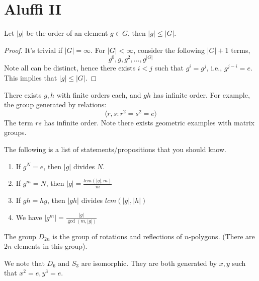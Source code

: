 \chapter{Aluffi II}

\begin{prop}
    Let $|g|$ be the order of an element $g\in G$, then $|g|\leq |G|$.
\end{prop}
\begin{proof}
    It's trivial if $|G|=\infty$. For $|G|<\infty$, consider the following $|G|+1$ terms,
    \begin{equation*}
        g^0, g, g^2, \ldots, g^{|G|}
    \end{equation*}
    Note all can be distinct, hence there exists $i<j$ such that $g^{i}=g^j$, i.e., $g^{j-i}=e$. This implies that $|g|\leq |G|$.
\end{proof}
\begin{example}
    There exists $g, h$ with finite orders each, and $gh$ has infinite order. For example, the group generated by relations:
    \begin{equation*}
        \langle r,s: r^2=s^2=e\rangle
    \end{equation*}
    The term $rs$ has infinite order. Note there exists geometric examples with matrix groups.
\end{example}
\begin{prop} The following is a list of statements/propositions that you should know.
\begin{enumerate}
    \item If $g^N=e$, then $|g|$ divides $N$.
    \item If $g^m=N$, then $|g|=\frac{lcm(|g|, m)}{m}$
    \item If $gh=hg$, then $|gh|$ divides $lcm(|g|, |h|)$
    \item We have $|g^m|=\frac{|g|}{\gcd(m, |g|)}$
\end{enumerate}
\end{prop}

\begin{defn}
    The group $D_{2n}$ 
    is the group of rotations and reflections of $n$-polygons. (There are $2n$ elements in this group).
\end{defn}

We note that $D_6$ and $S_3$ are isomorphic. They are both generated by $x,y$ such that $x^2=e, y^3=e$.

